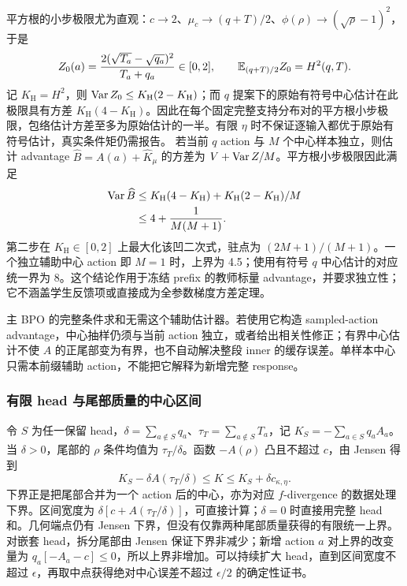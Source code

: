 平方根的小步极限尤为直观：$c\to2$、$\mu_c\to(q+T)/2$、$\phi(\rho)\to(\sqrt\rho-1)^2$，于是
\begin{equation}
 Z_0(a)=\frac{2(\sqrt{T_a}-\sqrt{q_a})^2}{T_a+q_a}\in[0,2],
 \qquad\mathbb E_{(q+T)/2}Z_0=H^2(q,T).
\end{equation}
记 $K_{\mathrm H}=H^2$，则 $\operatorname{Var} Z_0\le K_{\mathrm H}(2-K_{\mathrm H})$；而 $q$ 提案下的原始有符号中心估计在此极限具有方差 $K_{\mathrm H}(4-K_{\mathrm H})$。因此在每个固定完整支持分布对的平方根小步极限，包络估计方差至多为原始估计的一半。有限 $\eta$ 时不保证逐输入都优于原始有符号估计，真实条件矩仍需报告。 若当前 $q$ action 与 $M$ 个中心样本独立，则估计 advantage $\widehat B=A(a)+\widehat K_\mu$ 的方差为 $V+\operatorname{Var} Z/M$。平方根小步极限因此满足
\begin{align}
 \operatorname{Var}\widehat B
 &\le K_{\mathrm H}(4-K_{\mathrm H})
    +K_{\mathrm H}(2-K_{\mathrm H})/M\\
 &\le4+\frac1{M(M+1)}.
\end{align}
第二步在 $K_{\mathrm H}\in[0,2]$ 上最大化该凹二次式，驻点为 $(2M+1)/(M+1)$。一个独立辅助中心 action 即 $M=1$ 时，上界为 4.5；使用有符号 $q$ 中心估计的对应统一界为 8。这个结论作用于冻结 prefix 的教师标量 advantage，并要求独立性；它不涵盖学生反馈项或直接成为全参数梯度方差定理。


主 BPO 的完整条件求和无需这个辅助估计器。若使用它构造 sampled-action advantage，中心抽样仍须与当前 action 独立，或者给出相关性修正；有界中心估计不使 $A$ 的正尾部变为有界，也不自动解决整段 inner 的缓存误差。单样本中心只需本前缀辅助 action，不能把它解释为新增完整 response。

\subsubsection{有限 head 与尾部质量的中心区间}

令 $S$ 为任一保留 head，$\delta=\sum_{a\notin S}q_a$、$\tau_T=\sum_{a\notin S}T_a$，记 $K_S=-\sum_{a\in S}q_aA_a$。当 $\delta>0$，尾部的 $\rho$ 条件均值为 $\tau_T/\delta$。函数 $-A(\rho)$ 凸且不超过 $c$，由 Jensen 得到
\begin{equation}
 \boxed{K_S-\delta A(\tau_T/\delta)
 \le K\le K_S+\delta c_{\kappa,\eta}.}
 \label{eq:center-head-tail-interval}
\end{equation}
下界正是把尾部合并为一个 action 后的中心，亦为对应 $f$-divergence 的数据处理下界。区间宽度为 $\delta[c+A(\tau_T/\delta)]$，可直接计算；$\delta=0$ 时直接用完整 head 和。几何端点仍有 Jensen 下界，但没有仅靠两种尾部质量获得的有限统一上界。 对嵌套 head，拆分尾部由 Jensen 保证下界非减少；新增 action $a$ 对上界的改变量为 $q_a[-A_a-c]\le0$，所以上界非增加。可以持续扩大 head，直到区间宽度不超过 $\epsilon$，再取中点获得绝对中心误差不超过 $\epsilon/2$ 的确定性证书。

